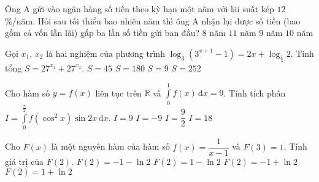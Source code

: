 	\begin{ex}%
		Ông A gửi vào ngân hàng số tiến theo kỳ hạn một năm với lãi suất kép $12$\%/năm. Hỏi sau tối thiểu bao nhiêu năm thì ông A nhận lại được số tiền (bao gồm cả vốn lẫn lãi) gấp ba lần số tiền gửi ban đầu?
		\choice
		{$8$ năm}
		{$11$ năm}
		{$9$ năm}
		{\True $10$ năm}
	\end{ex}
	\begin{ex}%
		Gọi $x_1$, $x_2$ là hai nghiệm của phương trình $\log_3(3^{x+1}-1)=2x+\log_{\frac{1}{3}}2$. Tính tổng $S=27^{x_1}+27^{x_2}$.
		\choice
		{$S=45$}
		{\True $S=180$}
		{$S=9$}
		{$S=252$}
	\end{ex}
	\begin{ex}%
		Cho hàm số $y=f(x)$ liên tục trên $\mathbb{R}$ và $\displaystyle\int\limits_0^1f(x)\mathrm{\,d}x=9$. Tính tích phân $I=\displaystyle\int\limits_0^{\frac{\pi}{2}}f(\cos^2x)\sin2x\mathrm{\,d}x$.
		\choice
		{\True $I=9$}
		{$I=-9$}
		{$I=\dfrac{9}{2}$}
		{$I=18$}
	\end{ex}
	\begin{ex}%
		Cho $F(x)$ là một nguyên hàm của hàm số $f(x)=\dfrac{1}{x-1}$ và $F(3)=1$. Tính giá trị của $F(2)$.
		\choice
		{$F(2)=-1-\ln2$}
		{\True $F(2)=1-\ln2$}
		{$F(2)=-1+\ln2$}
		{$F(2)=1+\ln2$}
	\end{ex}
